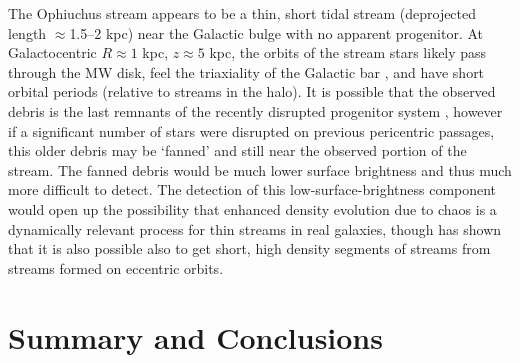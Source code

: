 \documentclass[letterpaper,12pt,preprint]{aastex}
\begin{document}
The Ophiuchus stream \citep{bernard14, sesar15} appears to be a thin, short tidal stream (deprojected length $\approx$1.5--2 kpc) near the Galactic bulge with no apparent progenitor. At Galactocentric $R \approx 1$ kpc, $z \approx 5$ kpc, the orbits of the stream stars likely pass through the MW disk, feel the triaxiality of the Galactic bar \citep[e.g.,][]{wegg13, wegg15}, and have short orbital periods (relative to streams in the halo). It is possible that the observed debris is the last remnants of the recently disrupted progenitor system \citep{sesar15}, however if a significant number of stars were disrupted on previous pericentric passages, this older debris may be `fanned' and still near the observed portion of the stream. The fanned debris would be much lower surface brightness and thus much more difficult to detect. The detection of this low-surface-brightness component would open up the possibility that enhanced density evolution due to chaos is a dynamically relevant process for thin streams in real galaxies, though \cite{carlberg15} has shown that it is also possible also to get short, high density segments of streams from streams formed on eccentric orbits.

\section{Summary and Conclusions}\label{sec:conclusions}

\end{document}
